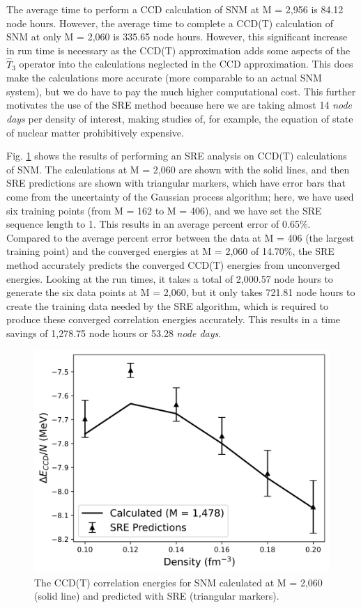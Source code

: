 The average time to perform a CCD calculation of SNM at M = 2,956 is 84.12 node hours.  However, the average time to complete a CCD(T) calculation of SNM at only M = 2,060 is 335.65 node hours.  However, this significant increase in run time is necessary as the CCD(T) approximation adds some aspects of the $\hat{T}_3$ operator into the calculations neglected in the CCD approximation.  This does make the calculations more accurate (more comparable to an actual SNM system), but we do have to pay the much higher computational cost.  This further motivates the use of the SRE method because here we are taking almost 14 \textit{node days} per density of interest, making studies of, for example, the equation of state of nuclear matter prohibitively expensive.

Fig. \ref{fig:ccdt_pert_sre} shows the results of performing an SRE analysis on CCD(T) calculations of SNM.  The calculations at M = 2,060 are shown with the solid lines, and then SRE predictions are shown with triangular markers, which have error bars that come from the uncertainty of the Gaussian process algorithm; here, we have used six training points (from M = 162 to M = 406), and we have set the SRE sequence length to 1.  This results in an average percent error of 0.65$\%$.  Compared to the average percent error between the data at M = 406 (the largest training point) and the converged energies at M = 2,060 of 14.70$\%$, the SRE method accurately predicts the converged CCD(T) energies from unconverged energies.  Looking at the run times, it takes a total of 2,000.57 node hours to generate the six data points at M = 2,060, but it only takes 721.81 node hours to create the training data needed by the SRE algorithm, which is required to produce these converged correlation energies accurately.  This results in a time savings of 1,278.75 node hours or 53.28 \textit{node days}.

\begin{figure}
    \centering
    \includegraphics[scale=0.75]{Images/Chapter8/FinalReport4b.png}
    \caption{The CCD(T) correlation energies for SNM calculated at M = 2,060 (solid line) and predicted with SRE (triangular markers).}
    \label{fig:ccdt_pert_sre}
\end{figure}

